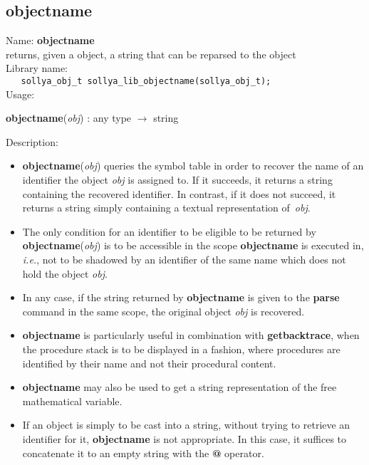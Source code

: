 \subsection{objectname}
\label{labobjectname}
\noindent Name: \textbf{objectname}\\
\phantom{aaa}returns, given a \sollya object, a string that can be reparsed to the object\\[0.2cm]
\noindent Library name:\\
\verb|   sollya_obj_t sollya_lib_objectname(sollya_obj_t);|\\[0.2cm]
\noindent Usage: 
\begin{center}
\textbf{objectname}(\emph{obj}) : \textsf{any type} $\rightarrow$ \textsf{string}\\
\end{center}
\noindent Description: \begin{itemize}

\item \textbf{objectname}(\emph{obj}) queries the \sollya symbol table in order to recover the
   name of an identifier the object \emph{obj} is assigned to. If it succeeds, it
   returns a string containing the recovered identifier. In contrast, if it
   does not succeed, it returns a string simply containing a textual
   representation of~\emph{obj}.

\item The only condition for an identifier to be eligible to be returned by
   \textbf{objectname}(\emph{obj}) is to be accessible in the scope \textbf{objectname} is executed in,
   \emph{i.e.}, not to be shadowed by an identifier of the same name which does not
   hold the object \emph{obj}.

\item In any case, if the string returned by \textbf{objectname} is given to the \textbf{parse}
   command in the same scope, the original object \emph{obj} is recovered.

\item \textbf{objectname} is particularly useful in combination with \textbf{getbacktrace}, when
   the \sollya procedure stack is to be displayed in a fashion, where
   procedures are identified by their name and not their procedural content.

\item \textbf{objectname} may also be used to get a string representation of the free
   mathematical variable.

\item If an object is simply to be cast into a string, without trying to
   retrieve an identifier for it, \textbf{objectname} is not appropriate. In this case,
   it suffices to concatenate it to an empty string with the \textbf{@} operator.
\end{itemize}
